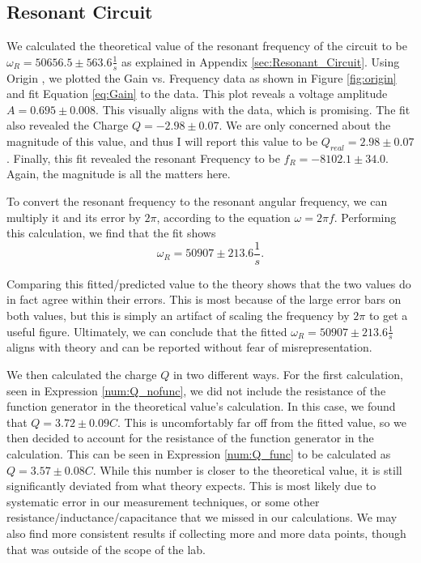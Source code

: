 \documentclass[12pt]{article}
\begin{document}
\subsection{Resonant Circuit}
We calculated the theoretical value of the resonant frequency of the circuit to be $\omega_R=50656.5\pm563.6\frac{1}{s}$ as explained in Appendix \ref{sec:Resonant_Circuit}. Using Origin , we plotted the Gain vs. Frequency data as shown in Figure \ref{fig:origin} and fit Equation \ref{eq:Gain} to the data. This plot reveals a voltage amplitude $A=0.695\pm0.008$. This visually aligns with the data, which is promising. The fit also revealed the Charge $Q=-2.98\pm0.07$. We are only concerned about the magnitude of this value, and thus I will report this value to be $Q_{real}=2.98\pm0.07$. Finally, this fit revealed the resonant Frequency to be $f_R=-8102.1\pm34.0$. Again, the magnitude is all the matters here.

To convert the resonant frequency to the resonant angular frequency, we can multiply it and its error by $2\pi$, according to the equation $\omega=2\pi f$. Performing this calculation, we find that the fit shows
\begin{equation*}
	\omega_R=50907\pm213.6 \frac{1}{s}.
\end{equation*}

Comparing this fitted/predicted value to the theory shows that the two values do in fact agree within their errors. This is most because of the large error bars on both values, but this is simply an artifact of scaling the frequency by $2\pi$ to get a useful figure. Ultimately, we can conclude that the fitted $\omega_R=50907\pm213.6 \frac{1}{s}$ aligns with theory and can be reported without fear of misrepresentation.

We then calculated the charge $Q$ in two different ways. For the first calculation, seen in Expression \ref{num:Q_nofunc}, we did not include the resistance of the function generator in the theoretical value's calculation. In this case, we found that $Q=3.72\pm0.09C$. This is uncomfortably far off from the fitted value, so we then decided to account for the resistance of the function generator in the calculation. This can be seen in Expression \ref{num:Q_func} to be calculated as $Q=3.57\pm0.08C$. While this number is closer to the theoretical value, it is still significantly deviated from what theory expects. This is most likely due to systematic error in our measurement techniques, or some other resistance/inductance/capacitance that we missed in our calculations. We may also find more consistent results if collecting more and more data points, though that was outside of the scope of the lab.
\end{document}
